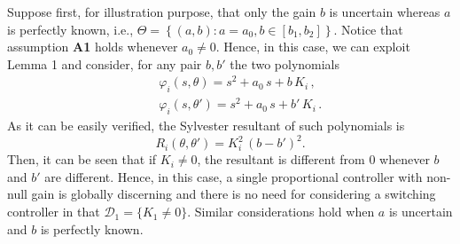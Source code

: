 \documentclass[letterpaper, 10 pt, conference]{ieeetran}
\begin{document}
Suppose first, for illustration purpose, that only the gain $b$ is uncertain whereas
$a$ is perfectly known, i.e., $\Theta = \left \{ (a,b): a=a_0, b \in [b_1 , b_2]  \right \}$. Notice that assumption \textbf{A1} holds whenever $a_0 \ne 0$. Hence, in this case, we can exploit Lemma 1 and consider, for any pair $b, b'$ the two polynomials
\begin{eqnarray*}
&& \varphi_i (s,\theta) = s^2 + a_0 \, s + b \, K_i \, , \\
&& \varphi_i (s,\theta') = s^2 + a_0 \, s + b' \, K_i \, .
\end{eqnarray*}
As it can be easily verified, the Sylvester resultant of such polynomials is
\[
R_i (\theta , \theta') = K_i^2 \, (b-b')^2 .
\]
Then, it can be seen that if $K_i \ne 0$, the resultant is different from $0$ whenever $b$ and $b'$ are different.  Hence, in this
case, a single proportional controller with non-null gain is globally discerning and there is no need for
considering a switching controller in that $\mathcal D_1 = \{ K_1 \ne 0 \}$. Similar considerations hold when $a$ is uncertain
and $b$ is perfectly known.
\end{document}
